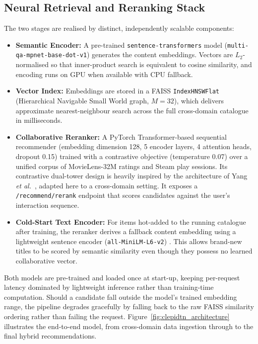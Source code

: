 \subsection{Neural Retrieval and Reranking Stack}
The two stages are realised by distinct, independently scalable components:
\begin{itemize}
    \item \textbf{Semantic Encoder:} A pre-trained \texttt{sentence-transformers} model (\texttt{multi-qa-mpnet-base-dot-v1}) \cite{reimers2019sentencebert} generates the content embeddings. Vectors are $L_2$-normalised so that inner-product search is equivalent to cosine similarity, and encoding runs on GPU when available with CPU fallback.
    \item \textbf{Vector Index:} Embeddings are stored in a FAISS \texttt{IndexHNSWFlat} \cite{johnson2019billion} (Hierarchical Navigable Small World graph, $M = 32$), which delivers approximate nearest-neighbour search across the full cross-domain catalogue in milliseconds.
    \item \textbf{Collaborative Reranker:} A PyTorch \cite{paszke2019pytorch} Transformer-based sequential recommender (embedding dimension 128, 5 encoder layers, 4 attention heads, dropout 0.15) trained with a contrastive objective \cite{oord2018cpc} (temperature 0.07) over a unified corpus of MovieLens-32M \cite{harper2015movielens} ratings and Steam \cite{steam_site} play sessions. Its contrastive dual-tower design is heavily inspired by the architecture of Yang \textit{et al.}~\cite{yang2025clepidtn}, adapted here to a cross-domain setting. It exposes a \texttt{/recommend/rerank} endpoint that scores candidates against the user's interaction sequence.
    \item \textbf{Cold-Start Text Encoder:} For items hot-added to the running catalogue after training, the reranker derives a fallback content embedding using a lightweight sentence encoder (\texttt{all-MiniLM-L6-v2}) \cite{wang2020minilm}. This allows brand-new titles to be scored by semantic similarity even though they possess no learned collaborative vector.
\end{itemize}
Both models are pre-trained and loaded once at start-up, keeping per-request latency dominated by lightweight inference rather than training-time computation. Should a candidate fall outside the model's trained embedding range, the pipeline degrades gracefully by falling back to the raw FAISS similarity ordering rather than failing the request. Figure~\ref{fig:clepidtn_architecture} illustrates the end-to-end model, from cross-domain data ingestion through to the final hybrid recommendations.


